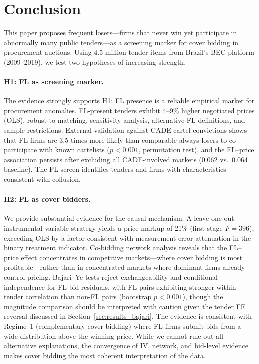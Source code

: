 \section{Conclusion}
\label{sec:conclusion}

This paper proposes frequent losers---firms that never win yet
participate in abnormally many public tenders---as a screening marker for
cover bidding in procurement auctions. Using 4.5 million tender-items
from Brazil's BEC platform (2009--2019), we test two hypotheses of
increasing strength.

\paragraph{H1: FL as screening marker.}
The evidence strongly supports H1: FL presence is a reliable empirical %
marker for procurement anomalies. FL-present tenders exhibit 4--9\%
higher negotiated prices (OLS), robust to matching, sensitivity analysis,
alternative FL definitions, and sample restrictions. External validation
against CADE cartel convictions shows that FL firms are 3.5 times
more likely than comparable always-losers to co-participate with known
cartelists ($p < 0.001$, permutation test), and the FL--price
association persists after excluding all CADE-involved markets (0.062
vs.\ 0.064 baseline). The FL screen identifies tenders and firms with
characteristics consistent with collusion.

\paragraph{H2: FL as cover bidders.}
We provide substantial evidence for the causal mechanism. A leave-one-out
instrumental variable strategy yields a price markup of 21\%
(first-stage $F = 396$), exceeding OLS by a factor consistent with
measurement-error attenuation in the binary treatment indicator.
Co-bidding network analysis reveals that the FL--price effect
concentrates in competitive markets---where cover bidding is most
profitable---rather than in concentrated markets where dominant firms
already control pricing. Bajari--Ye tests reject exchangeability and
conditional independence for FL bid residuals, with FL pairs exhibiting
stronger within-tender correlation than non-FL pairs (bootstrap
$p < 0.001$), though the magnitude comparison should be interpreted
with caution given the tender FE reversal discussed in
Section~\ref{sec:results_bajari}. The evidence is consistent with Regime~1
(complementary cover bidding) where FL firms submit bids from a wide
distribution above the winning price. While we cannot rule out all alternative explanations, the convergence %
of IV, network, and bid-level evidence makes cover bidding the most
coherent interpretation of the data.

